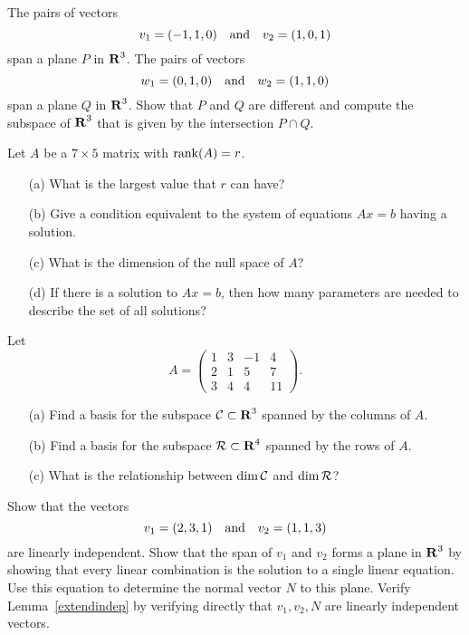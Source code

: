 \begin{exercise} \label{c5.7.2}
The pairs of vectors
\[
     v_1=(-1,1,0) \quad\mbox{and}\quad v_2=(1,0,1)
\]
span a plane $P$ in $\mbox{$\bf{R}$}^3$.  The pairs of vectors
\[
        w_1=(0,1,0) \quad\mbox{and}\quad w_2=(1,1,0)
\]
span a plane $Q$ in $\mbox{$\bf{R}$}^3$.  Show that $P$ and $Q$
are different and compute the subspace of $\mbox{$\bf{R}$}^3$ that
is given by the intersection $P\cap Q$.
\end{exercise}

\begin{exercise} \label{c5.6.1}
Let $A$ be a $7\times 5$ matrix with ${\rm rank}(A)=r$.
\begin{itemize}
\item[(a)]	What is the largest value that $r$ can have?
\item[(b)]	Give a condition equivalent to the system of
	equations $Ax=b$ having a solution.
\item[(c)]	What is the dimension of the null space of $A$?
\item[(d)]	If there is a solution to $Ax=b$, then how many
parameters are needed to describe the set of all solutions?
\end{itemize}
\end{exercise}

\begin{exercise} \label{c5.6.2}
Let
\[
A=\left(\begin{array}{rrrr} 1 & 3 & -1 & 4\\ 2& 1 & 5 & 7\\ 3 & 4 & 4 & 11
\end{array}\right).
\]
\begin{itemize}
\item[(a)] Find a basis for the subspace ${\cal C}\subset\mbox{$\bf{R}$}^3$ spanned by the
columns of $A$.
\item[(b)] Find a basis for the subspace ${\cal R}\subset\mbox{$\bf{R}$}^4$ spanned by the
rows of $A$.
\item[(c)] What is the relationship between $\dim {\cal C}$ and
$\dim {\cal R}$?
\end{itemize}
\end{exercise}


\begin{exercise} \label{c5.6.3}
Show that the vectors
\[
v_1=(2,3,1) \quad\mbox{and}\quad v_2=(1,1,3)
\]
are linearly independent.   Show that the span of $v_1$ and $v_2$
forms a plane in $\mbox{$\bf{R}$}^3$ by showing that every linear combination
 is the solution to a single linear equation.  Use this equation
to determine the normal vector $N$ to this plane.  Verify
Lemma~\ref{extendindep} by verifying directly that $v_1,v_2,N$
are linearly independent vectors.
\end{exercise}

